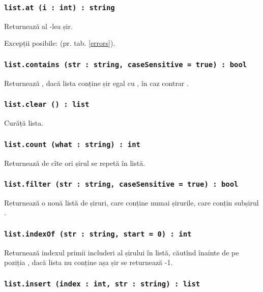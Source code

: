\subsubsection{\lstinline|list.at (i : int) : string|}

Returnează al -lea șir.

Excepții posibile:  (pr. tab. \ref{errors}).

\subsubsection{\lstinline|list.contains (str : string, caseSensitive = true) : bool|}

Returnează \true, dacă lista conține șir egal cu , în caz contrar \false.

\subsubsection{\lstinline|list.clear () : list|}

Curăță lista.

\subsubsection{\lstinline|list.count (what : string) : int|}

Returnează de cîte ori șirul  se repetă în listă.

\subsubsection{\lstinline|list.filter (str : string, caseSensitive = true) : bool|}

Returnează o nouă listă de șiruri, care conține numai șirurile, care conțin subșirul . 

\subsubsection{\lstinline|list.indexOf (str : string, start = 0) : int|}

Returnează indexul primii includeri al șirului  în listă, căutînd înainte de pe poziția , dacă lista nu conține așa șir se returnează -1.

\subsubsection{\lstinline|list.insert (index : int, str : string) : list|}

